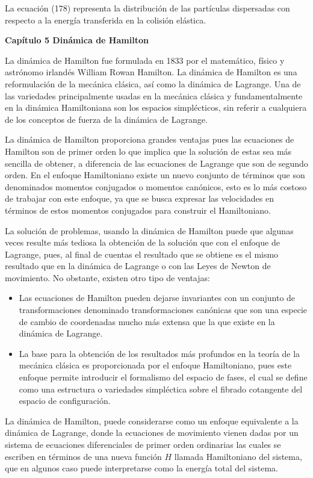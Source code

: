 \documentclass[]{article}
\begin{document}
La ecuación (178) representa la distribución de las partículas
dispersadas con respecto a la energía transferida en la colisión
elástica.

\textbf{Capítulo 5 Dinámica de Hamilton}

La dinámica de Hamilton fue formulada en 1833 por el matemático, físico
y astrónomo irlandés William Rowan Hamilton. La dinámica de Hamilton es
una reformulación de la mecánica clásica, así como la dinámica de
Lagrange. Una de las variedades principalmente usadas en la mecánica
clásica y fundamentalmente en la dinámica Hamiltoniana son los espacios
simplécticos, sin referir a cualquiera de los conceptos de fuerza de la
dinámica de Lagrange.

La dinámica de Hamilton proporciona grandes ventajas pues las ecuaciones
de Hamilton son de primer orden lo que implica que la solución de estas
sea más sencilla de obtener, a diferencia de las ecuaciones de Lagrange
que son de segundo orden. En el enfoque Hamiltoniano existe un nuevo
conjunto de términos que son denominados momentos conjugados o momentos
canónicos, esto es lo más costoso de trabajar con este enfoque, ya que
se busca expresar las velocidades en términos de estos momentos
conjugados para construir el Hamiltoniano.

La solución de problemas, usando la dinámica de Hamilton puede que
algunas veces resulte más tediosa la obtención de la solución que con el
enfoque de Lagrange, pues, al final de cuentas el resultado que se
obtiene es el mismo resultado que en la dinámica de Lagrange o con las
Leyes de Newton de movimiento. No obstante, existen otro tipo de
ventajas:

\begin{itemize}
\item
  Las ecuaciones de Hamilton pueden dejarse invariantes con un conjunto
  de transformaciones denominado transformaciones canónicas que son una
  especie de cambio de coordenadas mucho más extensa que la que existe
  en la dinámica de Lagrange.
\item
  La base para la obtención de los resultados más profundos en la teoría
  de la mecánica clásica es proporcionada por el enfoque Hamiltoniano,
  pues este enfoque permite introducir el formalismo del espacio de
  fases, el cual se define como una estructura o variedades simpléctica
  sobre el fibrado cotangente del espacio de configuración.
\end{itemize}

La dinámica de Hamilton, puede considerarse como un enfoque equivalente
a la dinámica de Lagrange, donde la ecuaciones de movimiento vienen
dadas por un sistema de ecuaciones diferenciales de primer orden
ordinarias las cuales se escriben en términos de una nueva función \(H\)
llamada Hamiltoniano del sistema, que en algunos caso puede
interpretarse como la energía total del sistema.
\end{document}
